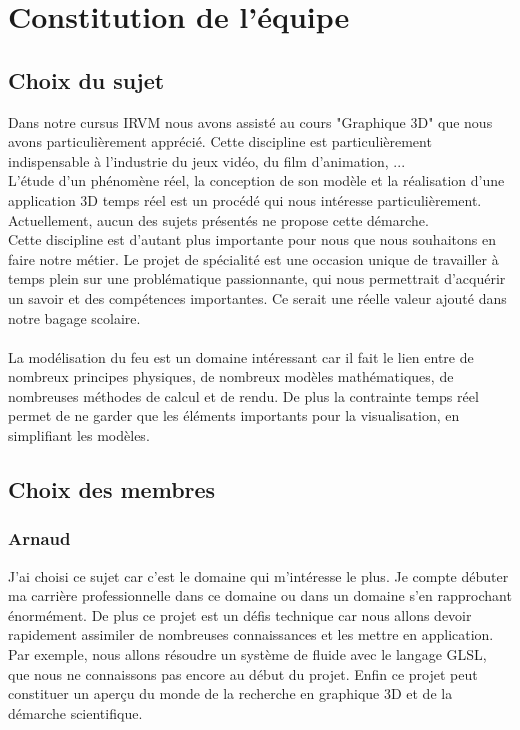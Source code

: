 \documentclass[a4paper,10pt]{article}
\begin{document}
\newpage

\tableofcontents

\newpage









\section{Constitution de l'équipe}

\subsection{Choix du sujet}

Dans notre cursus IRVM nous avons assisté au cours "Graphique 3D" que nous avons particulièrement apprécié. Cette discipline est particulièrement indispensable à l'industrie du jeux vidéo, du film d'animation, ... \\
L'étude d'un phénomène réel, la conception de son modèle et la réalisation d'une application 3D temps réel est un procédé qui nous intéresse particulièrement. Actuellement, aucun des sujets présentés ne propose cette démarche.\\
Cette discipline est d'autant plus importante pour nous que nous souhaitons en faire notre métier. Le projet de spécialité est une occasion unique de travailler à temps plein sur une problématique passionnante, qui nous permettrait d'acquérir un savoir et des compétences importantes. Ce serait une réelle valeur ajouté dans notre bagage scolaire.\\
~\\
La modélisation du feu est un domaine intéressant car il fait le lien entre de nombreux principes physiques, de nombreux modèles mathématiques, de nombreuses méthodes de calcul et de rendu. De plus la contrainte temps réel permet de ne garder que les éléments importants pour la visualisation, en simplifiant les modèles.

\subsection{Choix des membres}
\subsubsection{Arnaud}
    J'ai choisi ce sujet car c'est le domaine qui m'intéresse le plus. Je compte débuter ma carrière professionnelle dans ce domaine ou dans un domaine s'en rapprochant énormément. De plus ce projet est un défis technique car nous allons devoir rapidement assimiler de nombreuses connaissances et les mettre en application. Par exemple, nous allons résoudre un système de fluide avec le langage GLSL, que nous ne connaissons pas encore au début du projet. Enfin ce projet peut constituer un aperçu du monde de la recherche en graphique 3D et de la démarche scientifique.\\
\end{document}
